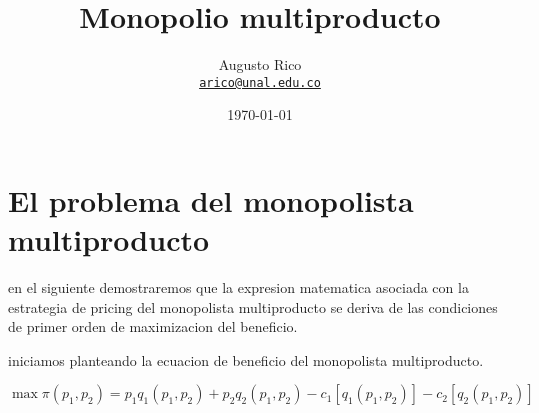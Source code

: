 \documentclass[11pt]{article}
\title{Monopolio multiproducto
}
\author{Augusto Rico\\
    \href{mailto:arico@unal.edu.co}{\texttt{arico@unal.edu.co}}
    }
\date{\today}
\begin{document}
{ %
\maketitle
}


\section{El problema del monopolista multiproducto}

\begin{flushleft}
    en el siguiente demostraremos que la expresion matematica asociada con la estrategia de pricing del monopolista multiproducto se deriva de las condiciones de primer orden de maximizacion del beneficio.
\end{flushleft}


\begin{flushleft}
    iniciamos planteando la ecuacion de beneficio del monopolista multiproducto.

    \begin{equation*}
        \max \pi(p_1,p_2) = p_1q_1(p_1,p_2) + p_2q_2(p_1,p_2)-c_1[q_1(p_1,p_2)]-c_2[q_2(p_1,p_2)]
    \end{equation*}
\end{flushleft}
\end{document}
